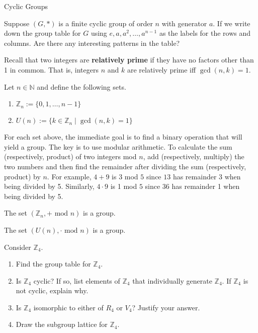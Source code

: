 \begin{section}{Cyclic Groups}
\begin{exercise}
Suppose $(G,*)$ is a finite cyclic group of order $n$ with generator $a$.  If we write down the group table for $G$ using $e, a, a^2, \ldots, a^{n-1}$ as the labels for the rows and columns.  Are there any interesting patterns in the table?
\end{exercise}

Recall that two integers are \textbf{relatively prime} if they have no factors other than 1 in common.  That is, integers $n$ and $k$ are relatively prime iff $\gcd(n,k)=1$.

\begin{definition}
Let $n\in\mathbb{N}$ and define the following sets.
\begin{enumerate}[label=\rm{(\alph*)}]
\item $\mathbb{Z}_n:=\{0,1,\ldots,n-1\}$
\item $U(n):=\{k\in\mathbb{Z}_n\mid \gcd(n,k)=1\}$
\end{enumerate}
\end{definition}

For each set above, the immediate goal is to find a binary operation that will yield a group.  The key is to use modular arithmetic.  To calculate the sum (respectively, product) of two integers mod $n$, add (respectively, multiply) the two numbers and then find the remainder after dividing the sum (respectively, product) by $n$. For example, $4+9$ is $3$ mod $5$ since $13$ has remainder 3 when being divided by 5.  Similarly, $4\cdot 9$ is 1 mod $5$ since 36 has remainder 1 when being divided by 5.

\begin{theorem}
The set $(\mathbb{Z}_n,+\text{ mod }n)$ is a group.  
\end{theorem}

\begin{theorem}
The set $(U(n),\cdot\text{ mod }n)$ is a group.  
\end{theorem}

\begin{exercise}
Consider $\mathbb{Z}_4$.
\begin{enumerate}[label=\rm{(\alph*)}]
\item Find the group table for $\mathbb{Z}_4$.
\item Is $\mathbb{Z}_4$ cyclic? If so, list elements of $\mathbb{Z}_4$ that individually generate $\mathbb{Z}_4$.  If $\mathbb{Z}_4$ is not cyclic, explain why.
\item Is $\mathbb{Z}_4$ isomorphic to either of $R_4$ or $V_4$? Justify your answer.
\item Draw the subgroup lattice for $\mathbb{Z}_4$.
\end{enumerate}
\end{exercise}


\end{section}
